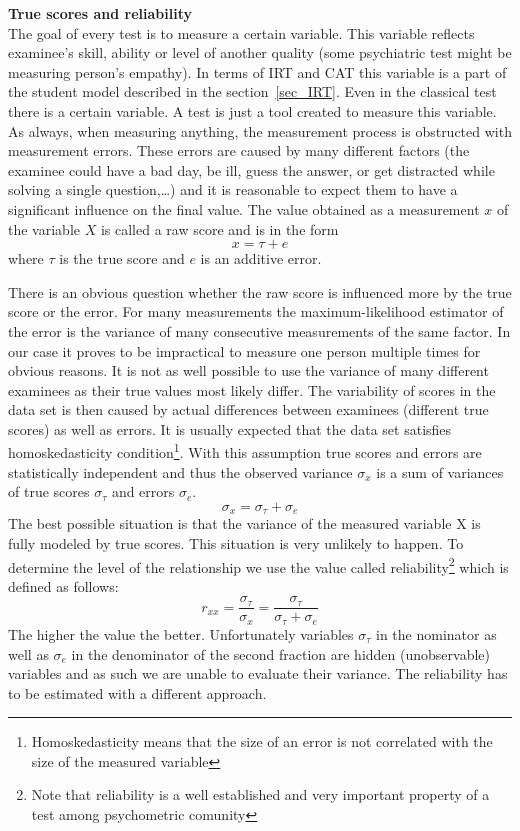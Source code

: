 \textbf{True scores and reliability}\\
The goal of every test is to measure a certain variable. This variable reflects examinee's skill, ability or level of another quality (some psychiatric test might be measuring person's empathy). In terms of IRT and CAT this variable is a part of the student model described in the section~\ref{sec_IRT}. Even in the classical test there is a certain variable. A test is just a tool created to measure this variable. As always, when measuring anything, the measurement process is obstructed with measurement errors. These errors are caused by many different factors (the examinee could have a bad day, be ill, guess the answer, or get distracted while solving a single question,\ldots) and it is reasonable to expect them to have a significant influence on the final value. The value obtained as a measurement $x$ of the variable $X$ is called a raw score and is in the form
$$x = \tau + e$$
where $\tau$ is the true score and $e$ is an additive error. 

There is an obvious question whether the raw score is influenced more by the true score or the error. For many measurements the maximum-likelihood estimator of the error is the variance of many consecutive measurements of the same factor. In our case it proves to be impractical to measure one person multiple times for obvious reasons. It is not as well possible to use the variance of many different examinees as their true values most likely differ. The variability of scores in the data set is then caused by actual differences between examinees (different true scores) as well as errors. It is usually expected that the data set satisfies homoskedasticity condition\footnote{Homoskedasticity means that the size of an error is not correlated with the size of the measured variable}. With this assumption true scores and errors are statistically independent and thus the observed variance $\sigma_x$ is a sum of variances of true scores $\sigma_\tau$ and errors $\sigma_e$.
$$\sigma_x=\sigma_\tau+\sigma_e$$
The best possible situation is that the variance of the measured variable X is fully modeled by true scores. This situation is very unlikely to happen. To determine the level of the relationship we use the value called reliability\footnote{Note that reliability is a well established and very important property of a test among psychometric comunity} which is defined as follows:
$$r_{xx} = \frac{\sigma_\tau}{\sigma_x}=\frac{\sigma_\tau}{\sigma_\tau+\sigma_e}$$
The higher the value the better. Unfortunately variables $\sigma_\tau$ in the nominator as well as $\sigma_e$ in the denominator of the second fraction are hidden (unobservable) variables and as such we are unable to evaluate their variance. The reliability has to be estimated with a different approach. 

